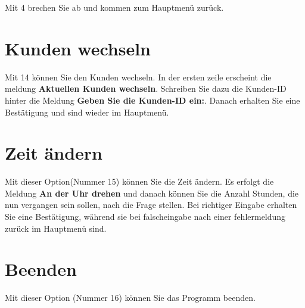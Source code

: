 ﻿\documentclass[a4paper,12pt,titlepage]{article}
\newcommand\enquote[1]{{\ttfamily \bfseries #1}}
\begin{document}
Mit 4 brechen Sie ab und kommen zum Hauptmenü zurück.

\section{Kunden wechseln}
Mit 14 können Sie den Kunden wechseln.
In der ersten zeile erscheint die meldung \enquote{Aktuellen Kunden wechseln}.
Schreiben Sie dazu die Kunden-ID hinter die Meldung \enquote{Geben Sie die Kunden-ID ein:}.
Danach erhalten Sie eine Bestätigung und sind wieder im Hauptmenü.

\section{Zeit ändern}
Mit dieser Option(Nummer 15) können Sie die Zeit ändern.
Es erfolgt die Meldung \enquote{An der Uhr drehen} und danach können Sie die Anzahl Stunden,
 die nun vergangen sein sollen, nach die Frage stellen.
Bei richtiger Eingabe erhalten Sie eine Bestätigung,
 während sie bei falscheingabe nach einer fehlermeldung zurück im Hauptmenü sind.

\section{Beenden}
Mit dieser Option (Nummer 16) können Sie das Programm beenden.
  
\end{document}
